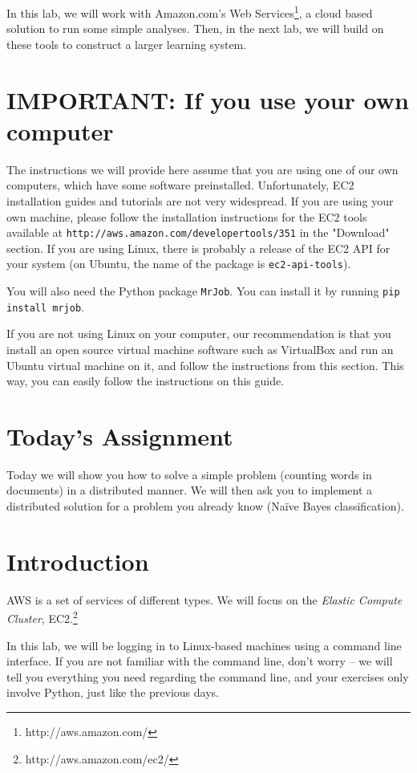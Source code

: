 In this lab, we will work with Amazon.com's Web Services\footnote{http://aws.amazon.com/}, a cloud based solution
to run some simple analyses. Then, in the next lab, we will build on these
tools to construct a larger learning system.

\section*{IMPORTANT: If you use your own computer}

The instructions we will provide here assume that you are using one of our own computers, which have some software preinstalled. Unfortunately, EC2 installation guides and tutorials are not very widespread. If you are using your own machine, please follow the installation instructions for the EC2 tools available at \texttt{http://aws.amazon.com/developertools/351} in the "Download" section. If you are using Linux, there is probably a release of the EC2 API for your system (on Ubuntu, the name of the package is \texttt{ec2-api-tools}).

You will also need the Python package \texttt{MrJob}. You can install it by running \texttt{pip install mrjob}.

If you are not using Linux on your computer, our recommendation is that you install an open source virtual machine software such as VirtualBox and run an Ubuntu virtual machine on it, and follow the instructions from this section. This way, you can easily follow the instructions on this guide.

\section*{Today's Assignment}

Today we will show you how to solve a simple problem (counting words in
documents) in a distributed manner. We will then ask you to implement a
distributed solution for a problem you already know (Na\"{i}ve Bayes
classification).

\section{Introduction}

AWS is a set of services of different types. We will focus on the \emph{Elastic
Compute Cluster}, EC2.\footnote{http://aws.amazon.com/ec2/}

In this lab, we will be logging in to Linux-based machines using a command line
interface. If you are not familiar with the command line, don't worry -- we
will tell you everything you need regarding the command line, and your
exercises only involve Python, just like the previous days.

